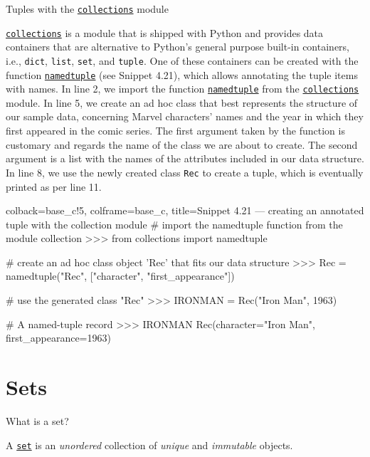 \documentclass[a4paper,11pt]{book}
\numberwithin{figure}{chapter}
\numberwithin{table}{chapter}
\newcommand{\question}[1]{%
    \begin{tcolorbox}[colback=comp_c!10,colframe=comp_c,sidebyside align=top,width=\linewidth,before skip=1ex]
        #1
    \end{tcolorbox}
    \switchcolumn%
}
\newcommand{\note}[1]{%
    \begin{tcolorbox}[colback=white!0,colframe=white!10,width=\linewidth,before skip=1ex]
        #1
    \end{tcolorbox}
}
\begin{document}
\begin{paracol}{2}
	\question{\raggedright Tuples with the \href{https://docs.python.org/3/library/collections.html}{\texttt{collections}} module}
	\note{\href{https://docs.python.org/3/library/collections.html}{\texttt{collections}} is a module that is shipped with Python and provides data containers that are alternative to Python's general purpose built-in containers, i.e., \texttt{dict}, \texttt{list}, \texttt{set}, and \texttt{tuple}. One of these containers can be created with the function \href{https://docs.python.org/3/library/collections.html\#collections.namedtuple}{\texttt{namedtuple}} (see Snippet 4.21), which allows annotating the tuple items with names. In line 2, we import the function \href{https://docs.python.org/3/library/collections.html\#collections.namedtuple}{\texttt{namedtuple}} from the \href{https://docs.python.org/3/library/collections.html\#collections}{\texttt{collections}} module. In line 5, we create an ad hoc class that best represents the structure of our sample data, concerning Marvel characters' names and the year in which they first appeared in the comic series. The first argument taken by the function is customary and regards the name of the class we are about to create. The second argument is a list with the names of the attributes included in our data structure. In line 8, we use the newly created class \texttt{Rec} to create a tuple, which is eventually printed as per line 11.}
\end{paracol}

\begin{pythoncode}[linenos=true,]{colback=base_c!5, colframe=base_c, title=\sffamily Snippet 4.21 --- creating an annotated tuple with the collection module}
# import the namedtuple function from the module collection
>>> from collections import namedtuple

# create an ad hoc class object 'Rec' that fits our data structure
>>> Rec = namedtuple("Rec", ["character", "first_appearance"])

# use the generated class "Rec"
>>> IRONMAN = Rec("Iron Man", 1963)

# A named-tuple record
>>> IRONMAN
Rec(character="Iron Man", first_appearance=1963)
\end{pythoncode}

\section{Sets}

\begin{paracol}{2}
	\question{\raggedright What is a set?}
	\note{A \href{https://docs.python.org/3/tutorial/datastructures.html\#sets}{\texttt{set}} is an \emph{unordered} collection of \emph{unique} and \emph{immutable} objects.}
\end{paracol}
\end{document}
